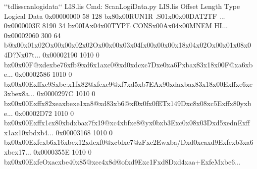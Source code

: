 \documentclass[letterpaper,10pt,english]{sphinxmanual}
\begin{document}
\begin{sphinxVerbatim}[commandchars=\\\{\}]
\PYGZdl{} {}`{}`tdlisscanlogidata{}`{}` LIS.lis
Cmd: ScanLogiData.py LIS.lis
Offset        Length  Type  Logical Data
0x00000000        58   128  b\PYGZsq{}\PYGZbs{}x80\PYGZbs{}x00RUN1R .S01\PYGZbs{}x00\PYGZbs{}x00DAT2TF            \PYGZsq{}...
0x0000003E      8190    34  b\PYGZsq{}\PYGZdq{}\PYGZbs{}x00IA\PYGZbs{}x04\PYGZbs{}x00TYPE    CONS\PYGZbs{}x00A\PYGZbs{}x04\PYGZbs{}x00MNEM    HI\PYGZsq{}...
0x00002060       300    64  b\PYGZsq{}@\PYGZbs{}x00\PYGZbs{}x01\PYGZbs{}x02O\PYGZbs{}x00\PYGZbs{}x00\PYGZbs{}x02\PYGZbs{}x02O\PYGZbs{}x00\PYGZbs{}x00\PYGZbs{}x03\PYGZbs{}x04I\PYGZbs{}x00\PYGZbs{}x00\PYGZbs{}x00\PYGZbs{}x18\PYGZbs{}x04\PYGZbs{}x02O\PYGZbs{}x00\PYGZbs{}x01\PYGZbs{}x08\PYGZbs{}x04D?N\PYGZbs{}x07\PYGZus{}\PYGZbs{}t\PYGZsq{}...
0x00002190      1010     0  b\PYGZdq{}\PYGZbs{}x00\PYGZbs{}x00F@\PYGZsq{}\PYGZbs{}xde\PYGZbs{}xbe76\PYGZbs{}xfb@\PYGZbs{}xd6\PYGZbs{}x1a\PYGZbs{}xc0@\PYGZbs{}xd0\PYGZbs{}xdc\PYGZbs{}xc7D\PYGZbs{}xe0\PYGZbs{}xa6P\PYGZbs{}xba\PYGZbs{}x83\PYGZbs{}x18\PYGZbs{}x00F@\PYGZam{}\PYGZbs{}xa6\PYGZbs{}xbe\PYGZhy{}\PYGZdq{}...
0x00002586      1010     0  b\PYGZsq{}\PYGZbs{}x00\PYGZbs{}x00E\PYGZbs{}xff\PYGZbs{}xe9S\PYGZbs{}xbe:\PYGZbs{}x1f\PYGZbs{}x82@\PYGZbs{}xfe\PYGZpc{}\PYGZbs{}xc9@\PYGZbs{}xf7\PYGZbs{}xd5\PYGZbs{}xb7EA\PYGZbs{}x90\PYGZbs{}xda\PYGZbs{}xba\PYGZbs{}x83\PYGZbs{}x18\PYGZbs{}x00E\PYGZbs{}xff\PYGZbs{}xe6\PYGZbs{}xe3\PYGZbs{}xbe\PYGZbs{}x8a\PYGZsq{}...
0x0000297C      1010     0  b\PYGZsq{}\PYGZbs{}x00\PYGZbs{}x00E\PYGZbs{}xff\PYGZbs{}x82\PYGZbs{}xea\PYGZbs{}xbe\PYGZhy{}\PYGZbs{}xe1\PYGZbs{}xa8@\PYGZbs{}xd83\PYGZbs{}xb6@\PYGZbs{}xf0\PYGZbs{}x0f\PYGZbs{}x0fET\PYGZbs{}x149D\PYGZbs{}xc8\PYGZbs{}x08\PYGZbs{}xc5E\PYGZbs{}xff\PYGZbs{}x80y\PYGZbs{}xbe\PYGZhy{}\PYGZsq{}...
0x00002D72      1010     0  b\PYGZsq{}\PYGZbs{}x00\PYGZbs{}x00E\PYGZbs{}xff\PYGZbs{}x1c\PYGZbs{}x80\PYGZbs{}xbd\PYGZbs{}xba\PYGZbs{}x7f\PYGZbs{}x19@\PYGZbs{}xc4\PYGZbs{}xbf\PYGZbs{}xe8@y\PYGZbs{}x0b\PYGZbs{}xb3E\PYGZbs{}xc0\PYGZbs{}x08\PYGZbs{}x03D\PYGZbs{}xd5\PYGZbs{}xednE\PYGZbs{}xff\PYGZbs{}x1a\PYGZbs{}x10\PYGZbs{}xbd\PYGZbs{}xb4\PYGZsq{}...
0x00003168      1010     0  b\PYGZsq{}\PYGZbs{}x00\PYGZbs{}x00E\PYGZbs{}xfe\PYGZbs{}xb6\PYGZbs{}x16\PYGZbs{}xbe\PYGZbs{}x12\PYGZbs{}xde\PYGZbs{}xf0@\PYGZbs{}xcbl\PYGZbs{}xe7@zF\PYGZbs{}xc2Ew\PYGZbs{}xba/D\PYGZbs{}xd0\PYGZbs{}xca\PYGZbs{}xd9E\PYGZbs{}xfe\PYGZbs{}xb3\PYGZbs{}xa6\PYGZbs{}xbe\PYGZbs{}x17\PYGZsq{}...
0x0000355E      1010     0  b\PYGZsq{}\PYGZbs{}x00\PYGZbs{}x00E\PYGZbs{}xfeO\PYGZbs{}xac\PYGZbs{}xbe40\PYGZbs{}x85@\PYGZbs{}xcc4\PYGZbs{}x8d@of\PYGZbs{}xd9E\PYGZbs{}xc1F\PYGZbs{}xd8D\PYGZbs{}xd4\PYGZbs{}xaa+E\PYGZbs{}xfeM\PYGZlt{}\PYGZbs{}xbe6\PYGZsq{}...

\end{sphinxVerbatim}
\end{document}
